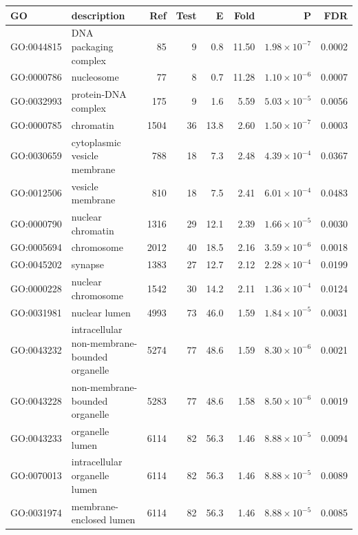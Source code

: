 
\begin{table}[ht]
\centering
\begin{adjustbox}{width=\textwidth}

\begin{tabular}{llrrrrrr}
  \hline
GO & description & Ref & Test & E & Fold & P & FDR \\ 
  \hline
GO:0044815 & DNA packaging complex  & 85 & 9 & 0.8 & 11.50 & $1.98 \times 10^{-7}$ & 0.0002 \\ 
  GO:0000786 & nucleosome  & 77 & 8 & 0.7 & 11.28 & $1.10 \times 10^{-6}$ & 0.0007 \\ 
  GO:0032993 & protein-DNA complex  & 175 & 9 & 1.6 & 5.59 & $5.03 \times 10^{-5}$ & 0.0056 \\ 
  GO:0000785 & chromatin  & 1504 & 36 & 13.8 & 2.60 & $1.50 \times 10^{-7}$ & 0.0003 \\ 
  GO:0030659 & cytoplasmic vesicle membrane  & 788 & 18 & 7.3 & 2.48 & $4.39 \times 10^{-4}$ & 0.0367 \\ 
  GO:0012506 & vesicle membrane  & 810 & 18 & 7.5 & 2.41 & $6.01 \times 10^{-4}$ & 0.0483 \\ 
  GO:0000790 & nuclear chromatin  & 1316 & 29 & 12.1 & 2.39 & $1.66 \times 10^{-5}$ & 0.0030 \\ 
  GO:0005694 & chromosome  & 2012 & 40 & 18.5 & 2.16 & $3.59 \times 10^{-6}$ & 0.0018 \\ 
  GO:0045202 & synapse  & 1383 & 27 & 12.7 & 2.12 & $2.28 \times 10^{-4}$ & 0.0199 \\ 
  GO:0000228 & nuclear chromosome  & 1542 & 30 & 14.2 & 2.11 & $1.36 \times 10^{-4}$ & 0.0124 \\ 
  GO:0031981 & nuclear lumen  & 4993 & 73 & 46.0 & 1.59 & $1.84 \times 10^{-5}$ & 0.0031 \\ 
  GO:0043232 & intracellular non-membrane-bounded organelle  & 5274 & 77 & 48.6 & 1.59 & $8.30 \times 10^{-6}$ & 0.0021 \\ 
  GO:0043228 & non-membrane-bounded organelle  & 5283 & 77 & 48.6 & 1.58 & $8.50 \times 10^{-6}$ & 0.0019 \\ 
  GO:0043233 & organelle lumen  & 6114 & 82 & 56.3 & 1.46 & $8.88 \times 10^{-5}$ & 0.0094 \\ 
  GO:0070013 & intracellular organelle lumen  & 6114 & 82 & 56.3 & 1.46 & $8.88 \times 10^{-5}$ & 0.0089 \\ 
  GO:0031974 & membrane-enclosed lumen  & 6114 & 82 & 56.3 & 1.46 & $8.88 \times 10^{-5}$ & 0.0085 \\ 

\end{tabular}
\end{adjustbox}
\end{table}
